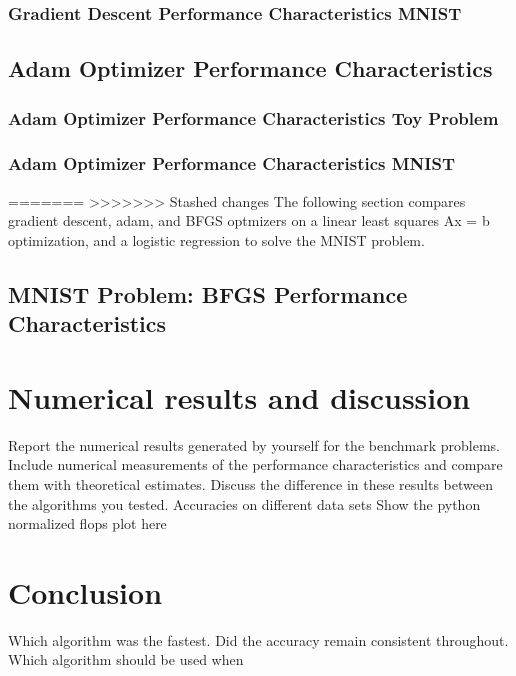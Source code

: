 \documentclass[10pt,twocolumn]{article}
\begin{document}
\subsubsection{Gradient Descent Performance Characteristics MNIST}

\subsection{Adam Optimizer Performance Characteristics}
\subsubsection{Adam Optimizer Performance Characteristics Toy Problem}
\subsubsection{Adam Optimizer Performance Characteristics MNIST}
=======
>>>>>>> Stashed changes
The following section compares gradient descent, adam, and BFGS optmizers on a linear least squares Ax = b optimization, and a logistic regression to solve the MNIST problem.


\subsection{MNIST Problem: BFGS Performance Characteristics}


\section{Numerical results and discussion}
Report the numerical results generated by yourself for the benchmark problems. Include numerical measurements of the performance characteristics and compare them with theoretical estimates. Discuss the difference in these results between the algorithms you tested.
Accuracies on different data sets
Show the python normalized flops plot here

\section{Conclusion}
Which algorithm was the fastest.
Did the accuracy remain consistent throughout.
Which algorithm should be used when



\end{document}
